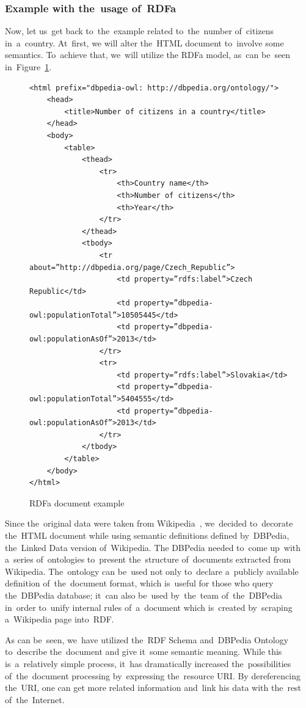 \subsubsection{Example with the~usage of~RDFa}

Now, let us~get back to~the~example related to~the~number of~citizens in~a~country. At~first, we
will alter the~HTML document to~involve some semantics. To~achieve that, we~will utilize the
RDFa model, as~can be~seen in~Figure~\ref{fig:example-rdfa}.

\begin{figure}
\scriptsize\begin{verbatim}
<html prefix="dbpedia-owl: http://dbpedia.org/ontology/">
    <head>
        <title>Number of citizens in a country</title>
    </head>
    <body>
        <table>
            <thead>
                <tr>
                    <th>Country name</th>
                    <th>Number of citizens</th>
                    <th>Year</th>
                </tr>
            </thead>
            <tbody>
                <tr about=”http://dbpedia.org/page/Czech_Republic”>
                    <td property=”rdfs:label”>Czech Republic</td>
                    <td property=”dbpedia-owl:populationTotal”>10505445</td>
                    <td property=”dbpedia-owl:populationAsOf”>2013</td>
                </tr>
                <tr>
                    <td property=”rdfs:label”>Slovakia</td>
                    <td property=”dbpedia-owl:populationTotal”>5404555</td>
                    <td property=”dbpedia-owl:populationAsOf”>2013</td>
                </tr>
            </tbody>
        </table>
    </body>
</html>
\end{verbatim}\normalsize
\caption{RDFa document example}
\label{fig:example-rdfa}
\end{figure}

Since the~original data were taken from Wikipedia~\cite{wikipedia}, we~decided to~decorate the~HTML document
while using semantic definitions defined by~DBPedia, the~Linked Data version of~Wikipedia. 
The DBPedia needed to~come up~with a~series of~ontologies to~present the~structure of~documents
extracted from Wikipedia. The~ontology can be~used not only to~declare a~publicly available definition of~the~document format, which is~useful for those who query the~DBPedia database; it~can also be~used by~the~team of~the~DBPedia in~order to~unify internal rules of~a~document which is~created by~scraping a~Wikipedia page into~RDF.

As can be~seen, we~have utilized the~RDF Schema and~DBPedia Ontology to~describe the~document
and give it~some semantic meaning. While this is~a~relatively simple process, it~has dramatically
increased the~possibilities of~the~document processing by~expressing the~resource URI.
By dereferencing the~URI, one can get more related information and~link his data with the~rest
of~the~Internet.

